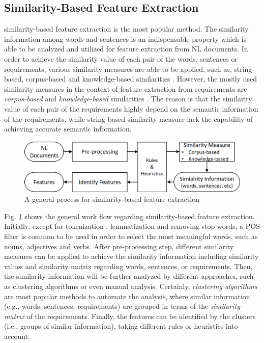 \documentclass[graybox]{svmult}
\begin{document}
\subsection{Similarity-Based Feature Extraction}

similarity-based feature extraction is the most popular method.
The similarity information among words and sentences is an indispensable property which is able to be analyzed and utilized for feature extraction from NL documents.
In order to achieve the similarity value of each pair of the words, sentences or requirements, various similarity measures are able to be applied, such as, string-based, corpus-based and knowledge-based similarities \cite{WaelA13}. However, the mostly used similarity measures in the context of feature extraction from requirements are \textit{corpus-based} and \textit{knowledge-based} similarities \cite{LiSS17}. The reason is that the similarity value of each pair of the requirements highly depend on the semantic information of the requirements, while string-based similarity measure lack the capability of achieving accurate semantic information.

\begin{figure}
\includegraphics[scale=0.4]{figs/similar_feature.png}
\caption{A general process for similarity-based feature extraction}
\label{fig:similar_feature}
\end{figure}

Fig. \ref{fig:similar_feature} shows the general work flow regarding similarity-based feature extraction. Initially, except for tokenization , lemmatization and removing stop words, a POS filter is common to be used in order to select the most meaningful words, such as nouns, adjectives and verbs. After pre-processing step, different similarity measures can be applied to achieve the similarity information including similarity values and similarity matrix regarding words, sentences, or requirements. Then, the similarity information will be further analyzed by different approaches, such as clustering algorithms or even manual analysis. Certainly, \textit{clustering algorithms} are most popular methods to automate the analysis, where similar information (e.g., words, sentences, requirements) are grouped in terms of the \textit{similarity matrix} of the requirements. Finally, the features can be identified by the clusters (i.e., groups of similar information), taking different rules or heuristics into account.
\end{document}
